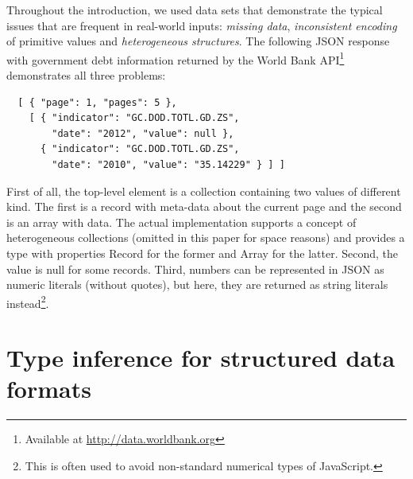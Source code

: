 \documentclass[10pt,preprint,blind,clearpagebib]{sigplanconf}
\newcommand{\kvd}[1]{\textnormal{\textcolor{kvdclr}{\sffamily #1}}}
\newcommand{\ident}[1]{\textnormal{\sffamily #1}}
\begin{document}
Throughout the introduction, we used data sets that demonstrate the typical issues that are frequent
in real-world inputs: \emph{missing data}, \emph{inconsistent encoding} of primitive values and 
\emph{heterogeneous structures}. The following JSON response with 
government debt information returned by the World Bank API\footnote{Available at 
\url{http://data.worldbank.org}} demonstrates all three problems:
%
{\small{
\begin{verbatim}
  [ { "page": 1, "pages": 5 },
    [ { "indicator": "GC.DOD.TOTL.GD.ZS",
        "date": "2012", "value": null },
      { "indicator": "GC.DOD.TOTL.GD.ZS",
        "date": "2010", "value": "35.14229" } ] ]
\end{verbatim}
}}
%
\noindent
First of all, the top-level element is a collection containing two values of different kind.
The first is a record with meta-data about the current page and the second is an array with data. 
The actual implementation supports a concept of heterogeneous collections (omitted in this paper
for space reasons) and provides a type with properties \ident{Record} for the former and 
\ident{Array} for the latter. Second, the \ident{value} is \kvd{null} for some records. Third, 
numbers can be represented in JSON as numeric literals (without quotes), but here, they are 
returned as string literals instead\footnote{This is often used to avoid non-standard numerical 
types of JavaScript.}.



%
%

\section{Type inference for structured data formats}
\label{sec:inference}
\end{document}
